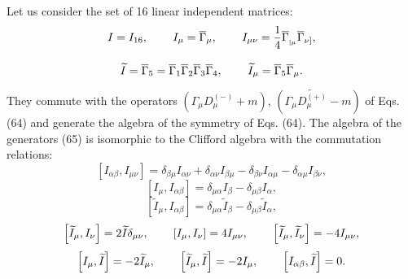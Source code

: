 \documentclass[a4paper,12pt]{article}
\begin{document}
Let us consider the set of 16 linear independent matrices:
\[
I=I_{16} ,\hspace{0.3in}I_\mu =\overline{\Gamma }_\mu ,
\hspace{0.3in} I_{\mu \nu }=\frac 14\overline{\Gamma }_{_{[\mu
}}\overline{\Gamma } _{\nu ]} ,
\]
\vspace{-8mm}
\begin{equation}  \label{65}
\end{equation}
\vspace{-8mm}
\[
\widetilde{I}=\overline{\Gamma }_5=\overline{\Gamma
}_1\overline{\Gamma }_2 \overline{\Gamma }_3\overline{\Gamma }_4 ,
\hspace{0.3in}\widetilde{I} _\mu =\overline{\Gamma
}_5\overline{\Gamma }_\mu .
\]

They commute with the operators $\left( \Gamma _\mu D_\mu
^{(-)}+m\right) $, $\left( \Gamma _\mu \overleftarrow{D_\mu
^{(+)}}-m\right) $ of Eqs. (64) and generate the algebra of the
symmetry of Eqs. (64). The algebra of the generators (65) is
isomorphic to the Clifford algebra with the commutation relations:
\[
\left[ I_{\alpha \beta },I_{\mu \nu }\right] =\delta _{\beta \mu
}I_{\alpha \nu }+\delta _{\alpha \nu }I_{\beta \mu }-\delta
_{\beta \nu }I_{\alpha \mu }-\delta _{\alpha \mu }I_{\beta \nu } ,
\]
\[
\left[ I_\mu ,I_{\alpha \beta }\right] =\delta _{\mu \alpha
}I_\beta -\delta _{\mu \beta }I_\alpha ,
\]
\begin{equation}
\left[ \widetilde{I}_\mu ,I_{\alpha \beta }\right] =\delta _{\mu
\alpha } \widetilde{I}_\beta -\delta _{\mu \beta
}\widetilde{I}_\alpha , \label{66}
\end{equation}
\[
\left[ \widetilde{I}_\mu ,I_\nu \right] =2\widetilde{I}\delta
_{\mu \nu } ,\hspace{0.3in}\left[ I_\mu ,I_\nu \right] =4I_{\mu
\nu } ,\hspace{0.3in}\left[ \widetilde{I}_\mu ,\widetilde{I}_\nu
\right] =-4I_{\mu \nu } ,
\]
\[
\left[ I_\mu ,\widetilde{I}\right] =-2\widetilde{I}_\mu
,\hspace{0.3in}\left[ \widetilde{I}_\mu ,\widetilde{I}\right]
=-2I_\mu  ,\hspace{0.3in}\left[ I_{\alpha \beta
},\widetilde{I}\right] =0 .
\]
\end{document}
